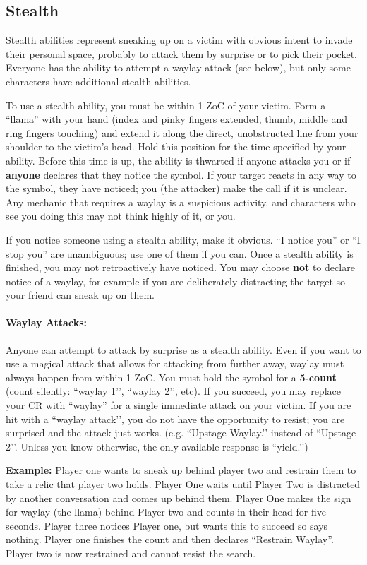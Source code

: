 \documentclass[sheet]{GL2020}
\begin{document}
\subsection{Stealth}

Stealth abilities represent sneaking up on a victim with obvious intent to invade their personal space, probably to attack them by surprise or to pick their pocket. Everyone has the ability to attempt a waylay attack (see below), but only some characters have additional stealth abilities.

To use a stealth ability, you must be within 1 ZoC of your victim. Form a ``llama'' with your hand (index and pinky fingers extended, thumb, middle and ring fingers touching) and extend it along the direct, unobstructed line from your shoulder to the victim's head. Hold this position for the time specified by your ability. Before this time is up, the ability is thwarted if anyone attacks you or if \textbf{anyone} declares that they notice the symbol. If your target reacts in any way to the symbol, they have noticed; you (the attacker) make the call if it is unclear. Any mechanic that requires a waylay is a suspicious activity, and characters who see you doing this may not think highly of it, or you.

If you notice someone using a stealth ability, make it obvious. ``I notice you'' or “I stop you” are unambiguous; use one of them if you can. Once a stealth ability is finished, you may not retroactively have noticed. You may choose \textbf{not} to declare notice of a waylay, for example if you are deliberately distracting the target so your friend can sneak up on them. 


\paragraph{Waylay Attacks:} Anyone can attempt to attack by surprise as a stealth ability. Even if you want to use a magical attack that allows for attacking from further away, waylay must always happen from within 1 ZoC. You must hold the symbol for a \textbf{5-count} (count silently: ``waylay 1’’, ``waylay 2’’, etc). If you succeed, you may replace your CR with ``waylay'' for a single immediate attack on your victim. If you are hit with a ``waylay attack'’, you do not have the opportunity to resist; you are surprised and the attack just works. (e.g. ``Upstage Waylay.’’ instead of ``Upstage 2’’. Unless you know otherwise, the only available response is ``yield.’’)


\textbf{Example:}\newline
Player one wants to sneak up behind player two and restrain them to take a relic that player two holds. Player One waits until Player Two is distracted by another conversation and comes up behind them. Player One makes the sign for waylay (the llama) behind Player two and counts in their head for five seconds. Player three notices Player one, but wants this to succeed so says nothing. Player one finishes the count and then declares “Restrain Waylay”. Player two is now restrained and cannot resist the search.  
\end{document}
